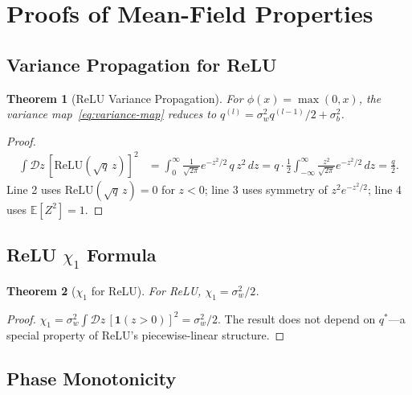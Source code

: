 \documentclass[10pt]{article}
\newcommand{\EE}{\mathbb{E}}
\newtheorem{theorem}{Theorem}
\begin{document}
\section{Proofs of Mean-Field Properties}
\label{app:proofs}

\subsection{Variance Propagation for ReLU}

\begin{theorem}[ReLU Variance Propagation]
\label{thm:relu-variance}
For $\phi(x) = \max(0, x)$, the variance map~\eqref{eq:variance-map} reduces to $q^{(l)} = \sigma_w^2 q^{(l-1)}/2 + \sigma_b^2$.
\end{theorem}

\begin{proof}
\begin{align}
\int \mathcal{D}z\, [\text{ReLU}(\sqrt{q}\, z)]^2
&= \int_0^{\infty} \frac{1}{\sqrt{2\pi}} e^{-z^2/2}\, q\, z^2\, dz
= q \cdot \frac{1}{2} \int_{-\infty}^{\infty} \frac{z^2}{\sqrt{2\pi}} e^{-z^2/2}\, dz
= \frac{q}{2}.
\end{align}
Line 2 uses $\text{ReLU}(\sqrt{q}\,z) = 0$ for $z < 0$; line 3 uses symmetry of $z^2 e^{-z^2/2}$; line 4 uses $\EE[Z^2] = 1$.
\end{proof}

\subsection{ReLU $\chi_1$ Formula}

\begin{theorem}[$\chi_1$ for ReLU]
\label{thm:chi1-relu}
For ReLU, $\chi_1 = \sigma_w^2 / 2$.
\end{theorem}

\begin{proof}
$\chi_1 = \sigma_w^2 \int \mathcal{D}z\, [\mathbf{1}(z > 0)]^2 = \sigma_w^2/2$.
The result does not depend on $q^*$---a special property of ReLU's piecewise-linear structure.
\end{proof}

\subsection{Phase Monotonicity}
\end{document}
